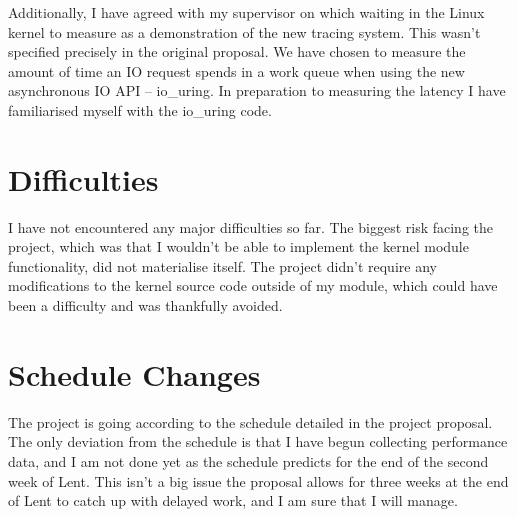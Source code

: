 \documentclass[12pt, A4]{article}
\begin{document}
        Additionally, I have agreed with my supervisor on which waiting in the Linux kernel to measure as a demonstration of the new tracing system. This wasn't specified precisely in the original proposal. We have chosen to measure the amount of time an IO request spends in a work queue when using the new asynchronous IO API -- io\_uring. In preparation to measuring the latency I have familiarised myself with the io\_uring code.

    \section{Difficulties}
        I have not encountered any major difficulties so far. The biggest risk facing the project, which was that I wouldn't be able to implement the kernel module functionality, did not materialise itself. The project didn't require any modifications to the kernel source code outside of my module, which could have been a difficulty and was thankfully avoided.

    \section{Schedule Changes}
        The project is going according to the schedule detailed in the project proposal. The only deviation from the schedule is that I have begun collecting performance data, and I am not done yet as the schedule predicts for the end of the second week of Lent. This isn't a big issue the proposal allows for three weeks at the end of Lent to catch up with delayed work, and I am sure that I will manage.  
\end{document}

